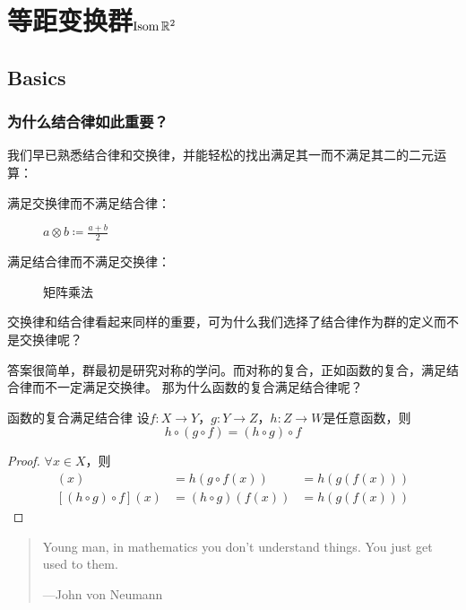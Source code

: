 \chapter{等距变换群\(\operatorname{\mathrm{Isom}} \mathbb{R}^{2}\)}

\section{Basics}

\subsection{为什么结合律如此重要？}
我们早已熟悉结合律和交换律，并能轻松的找出满足其一而不满足其二的二元运算：

\begin{description}
    \item[满足交换律而不满足结合律：] \(a \otimes b \coloneqq \frac{a+b}{2}\)
    \item[满足结合律而不满足交换律：] 矩阵乘法
\end{description}

交换律和结合律看起来同样的重要，可为什么我们选择了结合律作为群的定义而不是交换律呢？

答案很简单，群最初是研究对称的学问。而对称的复合，正如函数的复合，满足结合律而不一定满足交换律。
那为什么函数的复合满足结合律呢？

\begin{theorem}{函数的复合满足结合律}
    设\(f: X\to Y\)，\(g: Y\to Z\)，\(h: Z\to W\)是任意函数，则
    \[
        h\circ(g\circ f)=(h\circ g)\circ f
    \]
\end{theorem}

\begin{proof}
    \(\forall x\in X\)，则
    \begin{align*}
        [h\circ(g\circ f)](x) & = h(g \circ f(x))  & = h(g(f(x))) \\
        [(h\circ g)\circ f](x) & = (h\circ g)(f(x)) & = h(g(f(x)))
    \end{align*}
\end{proof}

\begin{quote}
    Young man, in mathematics you don't understand things.
    You just get used to them.

    \hfill ---John von Neumann
\end{quote}

